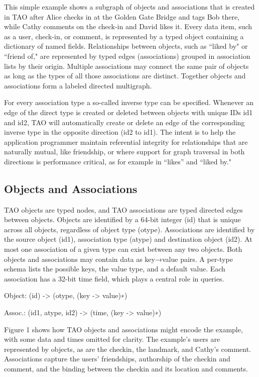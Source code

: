 \documentclass[9pt,twocolumn,twoside]{../../styles/osajnl}
\begin{document}
This simple example shows a subgraph of objects and associations that is created in TAO after Alice checks in at the Golden Gate Bridge and tags Bob there, while Cathy comments on the check-in and David likes it. Every data item, such as a user, check-in, or comment, is represented by a typed object containing a dictionary of named fields. Relationships between objects, such as “liked by" or “friend of," are represented by typed edges (associations) grouped in association lists by their origin. Multiple associations may connect the same pair of objects as long as the types of all those associations are distinct. Together objects and associations form a labeled directed multigraph.

For every association type a so-called inverse type can be specified. Whenever an edge of the direct type is created or deleted between objects with unique IDs id1 and id2, TAO will automatically create or delete an edge of the corresponding inverse type in the opposite direction (id2 to id1). The intent is to help the application programmer maintain referential integrity for relationships that are naturally mutual, like friendship, or where support for graph traversal in both directions is performance critical, as for example in “likes” and “liked by."

\subsection{Objects and Associations}
\cite{book-tao1} TAO objects are typed nodes, and TAO associations are typed directed edges between objects. Objects are identified by a 64-bit integer (id) that is unique across all objects, regardless of object type (otype). Associations are identified by the source object (id1), association type (atype) and destination object (id2). At most one association of a given type can exist between any two objects. Both objects and associations may contain data as key→value pairs. A per-type schema lists the possible keys, the value type, and a default value. Each association has a 32-bit time field, which plays a central
role in queries.

Object: (id) -> (otype, (key -> value)∗)

Assoc.: (id1, atype, id2) -> (time, (key -> value)∗)

Figure 1 shows how TAO objects and associations might encode the example, with some data and times omitted for clarity. The example’s users are represented by objects, as are the checkin, the landmark, and Cathy’s comment. Associations capture the users’ friendships, authorship of the checkin and comment, and the binding between the checkin and its location and comments.
\end{document}
